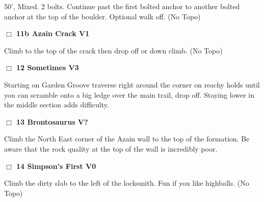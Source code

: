 \begin{multicols}{2}
\begin{adjustwidth}{0.5cm}{}
\begin{adjustwidth}{1.3em}{}
50', Mixed. 2 bolts. Continue past the first bolted anchor to another bolted anchor at the top of the boulder. Optional walk off.
  (No Topo)
\end{adjustwidth}




\needspace{2em}
\label{vr:Azain Crack}
\colorbox{green!20}{
\parbox{0.95\linewidth}{
\hspace{-1ex}\textbf{$\Box$
11b Azain Crack V1  
}}}
\begin{adjustwidth}{1.3em}{}			

Climb to the top of the crack then drop off or down climb.
  (No Topo)
\end{adjustwidth}



\end{adjustwidth}


\needspace{2em}
\label{rt:Sometimes}
\colorbox{green!20}{
\parbox{0.95\linewidth}{
\hspace{-1ex}\textbf{$\Box$
12 Sometimes V3  
}}}
\begin{adjustwidth}{1.3em}{}			

Starting on Garden Groove traverse right around the corner on reachy holds until you can scramble onto a big ledge over the main trail, drop off. Staying lower in the middle section adds difficulty.
\end{adjustwidth}




\needspace{2em}
\label{rt:Brontosaurus}
\colorbox{black!20}{
\parbox{0.95\linewidth}{
\hspace{-1ex}\textbf{$\Box$
13 Brontosaurus V?  \warn\warn\warn
}}}
\begin{adjustwidth}{1.3em}{}			

Climb the North East corner of the Azain wall to the top of the formation. Be aware that the rock quality at the top of the wall is incredibly poor.
\end{adjustwidth}




\needspace{2em}
\label{rt:Simpson's First}
\colorbox{green!20}{
\parbox{0.95\linewidth}{
\hspace{-1ex}\textbf{$\Box$
14 Simpson's First V0  
}}}
\begin{adjustwidth}{1.3em}{}			

Climb the dirty slab to the left of the locksmith. Fun if you like highballs.
  (No Topo)
\end{adjustwidth}







\null\newpage
	\end{multicols}
